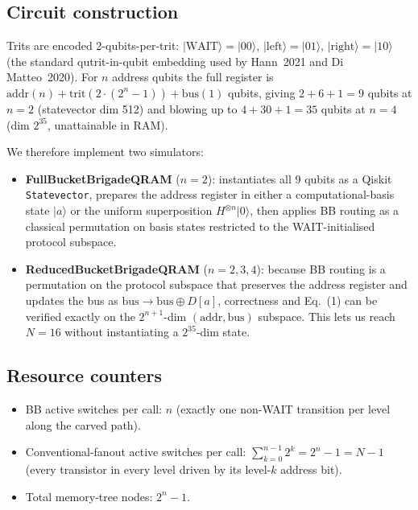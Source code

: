 \documentclass[11pt]{article}
\begin{document}
\subsection{Circuit construction}
Trits are encoded 2-qubits-per-trit: $|\mathrm{WAIT}\rangle = |00\rangle$,
$|\mathrm{left}\rangle = |01\rangle$, $|\mathrm{right}\rangle = |10\rangle$
(the standard qutrit-in-qubit embedding used by Hann~2021 and Di Matteo~2020).
For $n$ address qubits the full register is $\mathrm{addr}(n) +
\mathrm{trit}(2\cdot(2^n{-}1)) + \mathrm{bus}(1)$ qubits, giving
$2 + 6 + 1 = 9$ qubits at $n{=}2$ (statevector dim 512) and blowing up to
$4 + 30 + 1 = 35$ qubits at $n{=}4$ (dim $2^{35}$, unattainable in RAM).

We therefore implement two simulators:
\begin{itemize}
  \item \textbf{FullBucketBrigadeQRAM} ($n{=}2$): instantiates all 9 qubits as
    a Qiskit \texttt{Statevector}, prepares the address register in either a
    computational-basis state $|a\rangle$ or the uniform superposition
    $H^{\otimes n}|0\rangle$, then applies BB routing as a classical
    permutation on basis states restricted to the WAIT-initialised
    protocol subspace.
  \item \textbf{ReducedBucketBrigadeQRAM} ($n{=}2,3,4$): because BB routing
    is a permutation on the protocol subspace that preserves the address
    register and updates the bus as $\mathrm{bus} \to \mathrm{bus} \oplus D[a]$,
    correctness and Eq.~(1) can be verified exactly on the $2^{n+1}$-dim
    $(\mathrm{addr}, \mathrm{bus})$ subspace. This lets us reach $N{=}16$
    without instantiating a $2^{35}$-dim state.
\end{itemize}

\subsection{Resource counters}
\begin{itemize}
  \item BB active switches per call: $n$ (exactly one non-WAIT transition per
    level along the carved path).
  \item Conventional-fanout active switches per call:
    $\sum_{k=0}^{n-1} 2^k = 2^n - 1 = N - 1$ (every transistor in every level
    driven by its level-$k$ address bit).
  \item Total memory-tree nodes: $2^n - 1$.
\end{itemize}
\end{document}
